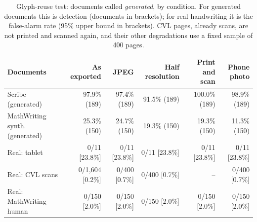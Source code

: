 \begin{table}[t]\centering\caption{Glyph-reuse test: documents called \emph{generated}, by condition. For generated documents this is detection (documents in brackets); for real handwriting it is the false-alarm rate (95\% upper bound in brackets). CVL pages, already scans, are not printed and scanned again, and their other degradations use a fixed sample of 400 pages.}\label{tab:twin}
\footnotesize\begin{tabular}{@{}lrrrrr@{}}\toprule
Documents & As exported & JPEG & Half resolution & Print and scan & Phone photo \\\midrule
Scribe (generated) & 97.9\% (189) & 97.4\% (189) & 91.5\% (189) & 100.0\% (189) & 98.9\% (189) \\
MathWriting synth. (generated) & 25.3\% (150) & 24.7\% (150) & 19.3\% (150) & 19.3\% (150) & 11.3\% (150) \\
Real: tablet & 0/11 [23.8\%] & 0/11 [23.8\%] & 0/11 [23.8\%] & 0/11 [23.8\%] & 0/11 [23.8\%] \\
Real: CVL scans & 0/1{,}604 [0.2\%] & 0/400 [0.7\%] & 0/400 [0.7\%] & -- & 0/400 [0.7\%] \\
Real: MathWriting human & 0/150 [2.0\%] & 0/150 [2.0\%] & 0/150 [2.0\%] & 0/150 [2.0\%] & 0/150 [2.0\%] \\
\bottomrule\end{tabular}\end{table}
